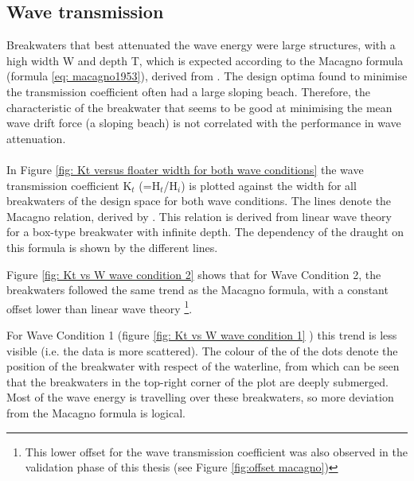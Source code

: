 \subsection{Wave transmission}
\label{sec: hydro analysis wave transmission}

Breakwaters that best attenuated the wave energy were large structures, with a high width W and depth T, which is expected according to the Macagno formula (formula \ref{eq: macagno1953}), derived from \citet{macagno1953fluid}. The design optima found to minimise the transmission coefficient often had a large sloping beach. Therefore, the characteristic of the breakwater that seems to be good at minimising the mean wave drift force (a sloping beach) is not correlated with the performance in wave attenuation.\\
\\
In Figure \ref{fig: Kt versus floater width for both wave conditions} the wave transmission coefficient K$_t$ (=H$_t$/H$_i$) is plotted against the width for all breakwaters of the design space for both wave conditions. The lines denote the Macagno relation, derived by \citet{macagno1953fluid}. This relation is derived from  linear wave theory for a box-type breakwater with infinite depth. The dependency of the draught on this formula is shown by the different lines. 

Figure \ref{fig: Kt vs W wave condition 2} shows that for Wave Condition 2, the breakwaters followed the same trend as the Macagno formula, with a constant offset lower than linear wave theory \footnote{This lower offset for the wave transmission coefficient was also observed in the validation phase of this thesis (see Figure \ref{fig:offset macagno})}.


For Wave Condition 1 (figure \ref{fig: Kt vs W wave condition 1} ) this trend is less visible (i.e. the data is more scattered). The colour of the of the dots denote the position of the breakwater with respect of the waterline, from which can be seen that the breakwaters in the top-right corner of the plot are deeply submerged. Most of the wave energy is travelling over these breakwaters, so more deviation from the Macagno formula is logical.

